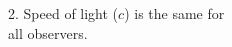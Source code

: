 \documentclass[preview]{standalone}
\begin{document}
\begin{center}
2. Speed of light ($c$) is the same for \\ all observers.
\end{center}
\end{document}
